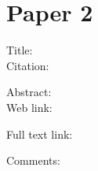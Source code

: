\documentclass{scrartcl}
\begin{document}
\section*{Paper 2}
\begin{description}
	\item[Title:]
	\item[Citation:] \cite{}
	\item[Abstract:]
	\item[Web link:] \url{}
	\item[Full text link:] \url{}
	\item[Comments:] 
\end{description}







\end{document}
